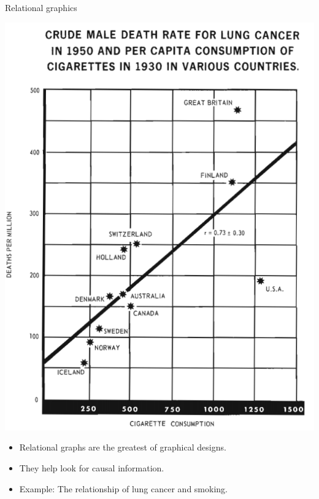 \documentclass[
  ignorenonframetext,
]{beamer}
\begin{document}
\begin{frame}{Relational graphics}
\label{relational-graphics-2}
\begin{minipage}{0.45\textwidth}
\centering
\includegraphics[width=\textwidth]{excellence_figs/fig_25.png}
\end{minipage}
\hfill
\begin{minipage}{0.5\textwidth}
\footnotesize
\begin{itemize}
  \item Relational graphs are the greatest of graphical designs.
  \item They help look for causal information.
  \item Example: The relationship of lung cancer and smoking.
\end{itemize}
\end{minipage}
\end{frame}
\end{document}

